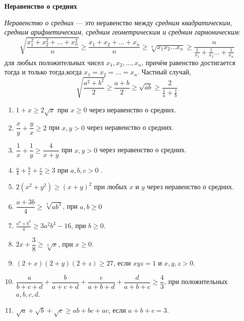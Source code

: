 \documentclass{article}
\begin{document}
\large
	
	
\begin{center}
	\textbf{Неравенство о средних}
\end{center}
	

\textit{Неравенство о средних} — это неравенство между \textit{средним квадратическим, средним арифметическим, средним геометрическим и средним гармоническим}: $$\sqrt{\frac{x_1^2+x_2^2+\dots+x_n^2}{n}}\ge\frac{x_1+x_2+\dots+x_n}{n}\ge\sqrt[n]{x_1x_2\dots x_n}\ge \dfrac{n}{\frac{1}{x_1}+\frac{1}{x_2}\dots+\frac{1}{x_n}}$$для любых положительных чисел $x_1, x_2, \dots , x_n$, причём равенство достигается тогда и только
тогда,когда $x_1 =x_2 =\dotsc=x_n$.
Частный случай, 
$$\sqrt{\dfrac{a^2 + b^2}{2}} \ge \dfrac{a+b}{2} \ge \sqrt{ab}  \ge \dfrac{2}{\frac{1}{a}+\frac{1}{b}}$$
	
\begin{enumerate}[label*=\protect\fbox{\arabic{enumi}}]

\item $1+x\ge 2\sqrt{x}$ при $x \geqslant 0$ через неравенство о средних.

\item $\dfrac{x}{y} + \dfrac{y}{x} \geqslant 2$  при $x, y > 0$ через неравенство о средних.

\item $\dfrac{1}{x}+\dfrac{1}{y}\geqslant\dfrac{4}{x+y}$ при $x, y > 0$ через неравенство о средних.

\item $\displaystyle \frac{a}{b} + \frac{b}{c} + \frac{c}{a} \geq 3$ при $a, b, c > 0$ .

\item $2(x^2 + y^2) \geqslant (x + y)^2$  при любых $x$ и $y$ через неравенство о средних.

\item $\dfrac{a+3b}{4}\geqslant \sqrt[4]{ab^3}$, при $a, b \geqslant 0$

\item $\displaystyle \frac{a^6 + b^9}{4}\geqslant 3a^2b^3-16$, при $b \geqslant 0$.

\item  $2x + \dfrac{3}{8} \geqslant \sqrt[4]{x}$, при $x \geqslant 0$.

\item $(2+x)(2+y)(2+z) \geqslant 27$, если $xyz = 1$ и $x, y, z > 0$.

\item $\dfrac{a}{b + c + d} + \dfrac{b}{a + c + d} + \dfrac{c}{a + b + d} + \dfrac{d}{a + b + c} \geqslant \dfrac{4}{3}$, при положительных $a, b, c, d$.

\item $\sqrt{a}+\sqrt{b}+\sqrt{c}\geqslant ab+bc+ac$, если $a+b+c = 3$.

		
	\end{enumerate}
\end{document}
